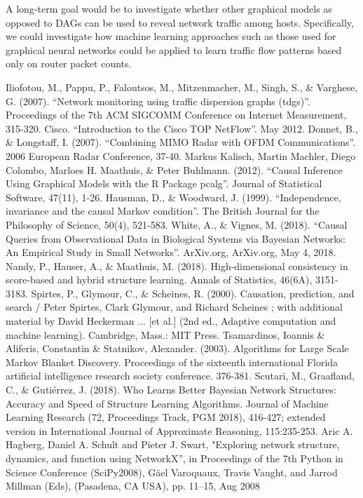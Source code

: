 \documentclass[conference]{IEEEtran}
\begin{document}
A long-term goal would be to investigate whether other graphical models as opposed to DAGs can be used to reveal network traffic among hosts. Specifically, we could investigate how machine learning approaches such as those used for graphical neural networks could be applied to learn traffic flow patterns based only on router packet counts.


\begin{thebibliography}{00}
 Iliofotou, M., Pappu, P., Faloutsos, M., Mitzenmacher, M., Singh, S., \& Varghese, G. (2007). ``Network monitoring using traffic dispersion graphs (tdgs)''. Proceedings of the 7th ACM SIGCOMM Conference on Internet Measurement, 315-320.
 Cisco. ``Introduction to the Cisco TOP NetFlow''. May 2012.
 Donnet, B., \& Longstaff, I. (2007). ``Combining MIMO Radar with OFDM Communications''. 2006 European Radar Conference, 37-40.
 Markus Kalisch, Martin Machler, Diego Colombo, Marloes H. Maathuis, \& Peter Buhlmann. (2012). ``Causal Inference Using Graphical Models with the R Package pcalg''. Journal of Statistical Software, 47(11), 1-26.
 Hausman, D., \& Woodward, J. (1999). ``Independence, invariance and the causal Markov condition''. The British Journal for the Philosophy of Science, 50(4), 521-583.
 White, A., \& Vignes, M. (2018). ``Causal Queries from Observational Data in Biological Systems via Bayesian Networks: An Empirical Study in Small Networks''. ArXiv.org, ArXiv.org, May 4, 2018.
 Nandy, P., Hauser, A., \& Maathuis, M. (2018). High-dimensional consistency in score-based and hybrid structure learning. Annals of Statistics, 46(6A), 3151-3183.
 Spirtes, P., Glymour, C., \& Scheines, R. (2000). Causation, prediction, and search / Peter Spirtes, Clark Glymour, and Richard Scheines ; with additional material by David Heckerman ... [et al.] (2nd ed., Adaptive computation and machine learning). Cambridge, Mass.: MIT Press.
 Tsamardinos, Ioannis \& Aliferis, Constantin \& Statnikov, Alexander. (2003). Algorithms for Large Scale Markov Blanket Discovery. Proceedings of the sixteenth international Florida artificial intelligence research society conference. 376-381.
 Scutari, M., Graafland, C., \& Gutiérrez, J. (2018). Who Learns Better Bayesian Network Structures: Accuracy and Speed of Structure Learning Algorithms. Journal of Machine Learning Research (72, Proceedings Track, PGM 2018), 416-427; extended version in International Journal of Approximate Reasoning, 115:235-253.
 Aric A. Hagberg, Daniel A. Schult and Pieter J. Swart, "Exploring network structure, dynamics, and function using NetworkX”, in Proceedings of the 7th Python in Science Conference (SciPy2008), Gäel Varoquaux, Travis Vaught, and Jarrod Millman (Eds), (Pasadena, CA USA), pp. 11–15, Aug 2008

\end{thebibliography}
\end{document}
